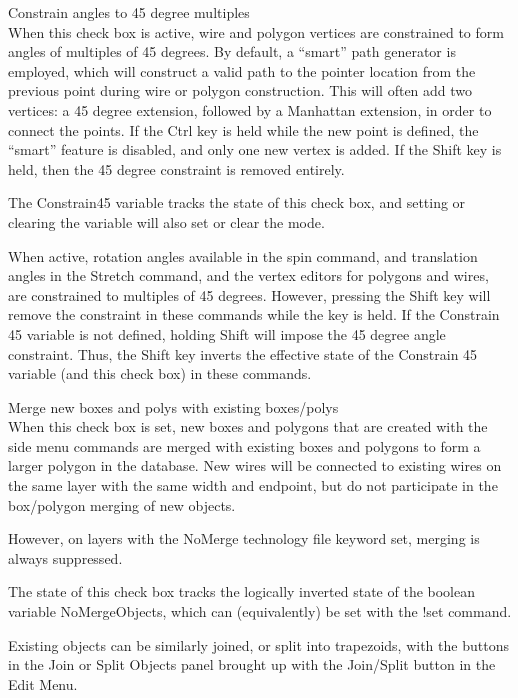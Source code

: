 \begin{description}
\item{\cb Constrain angles to 45 degree multiples}\\
When this check box is active, wire and polygon vertices are
constrained to form angles of multiples of 45 degrees.  By default, a
``smart'' path generator is employed, which will construct a valid
path to the pointer location from the previous point during wire or
polygon construction.  This will often add two vertices:  a 45 degree
extension, followed by a Manhattan extension, in order to connect the
points.  If the {\kb Ctrl} key is held while the new point is defined,
the ``smart'' feature is disabled, and only one new vertex is added. 
If the {\kb Shift} key is held, then the 45 degree constraint is
removed entirely.

The {\et Constrain45} variable tracks the state of this check box, and
setting or clearing the variable will also set or clear the mode.

When active, rotation angles available in the {\cb spin} command, and
translation angles in the {\cb Stretch} command, and the vertex
editors for polygons and wires, are constrained to multiples of 45
degrees.  However, pressing the {\kb Shift} key will remove the
constraint in these commands while the key is held.  If the {\et
Constrain 45} variable is not defined, holding {\kb Shift} will impose
the 45 degree angle constraint.  Thus, the {\kb Shift} key inverts the
effective state of the {\et Constrain 45} variable (and this check
box) in these commands.

\item{\cb Merge new boxes and polys with existing boxes/polys}\\
When this check box is set, new boxes and polygons that are created
with the side menu commands are merged with existing boxes and
polygons to form a larger polygon in the database.  New wires will be
connected to existing wires on the same layer with the same width and
endpoint, but do not participate in the box/polygon merging of new
objects.

However, on layers with the {\vt NoMerge} technology file keyword set,
merging is always suppressed.

The state of this check box tracks the logically inverted state of the
boolean variable {\et NoMergeObjects}, which can (equivalently) be set
with the {\cb !set} command.

Existing objects can be similarly joined, or split into trapezoids,
with the buttons in the {\cb Join or Split Objects} panel brought up
with the {\cb Join/Split} button in the {\cb Edit Menu}.


\end{description}
